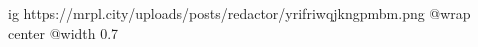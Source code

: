  
 
 
 
 

\ifcmt
  ig https://mrpl.city/uploads/posts/redactor/yrifriwqjkngpmbm.png
  @wrap center
  @width 0.7
\fi
